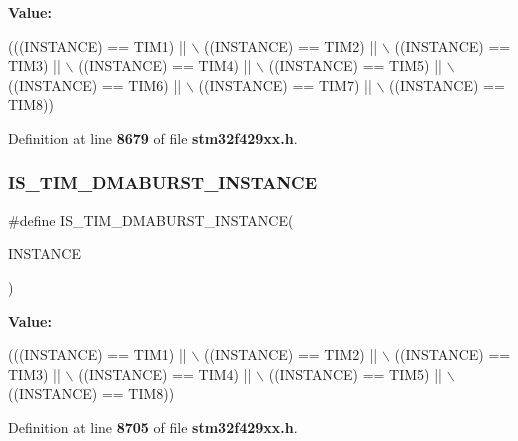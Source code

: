 {\bfseries Value\+:}
\begin{DoxyCode}
(((INSTANCE) == TIM1) || \(\backslash\)
                                       ((INSTANCE) == TIM2) || \(\backslash\)
                                       ((INSTANCE) == TIM3) || \(\backslash\)
                                       ((INSTANCE) == TIM4) || \(\backslash\)
                                       ((INSTANCE) == TIM5) || \(\backslash\)
                                       ((INSTANCE) == TIM6) || \(\backslash\)
                                       ((INSTANCE) == TIM7) || \(\backslash\)
                                       ((INSTANCE) == TIM8))
\end{DoxyCode}


Definition at line \textbf{ 8679} of file \textbf{ stm32f429xx.\+h}.

\mbox{\label{group__Exported__macros_ga1ed43d4e9823446a1b9d43afc452f42e}} 
\subsubsection{I\+S\+\_\+\+T\+I\+M\+\_\+\+D\+M\+A\+B\+U\+R\+S\+T\+\_\+\+I\+N\+S\+T\+A\+N\+CE}
{\footnotesize\ttfamily \#define I\+S\+\_\+\+T\+I\+M\+\_\+\+D\+M\+A\+B\+U\+R\+S\+T\+\_\+\+I\+N\+S\+T\+A\+N\+CE(\begin{DoxyParamCaption}\item[{}]{I\+N\+S\+T\+A\+N\+CE }\end{DoxyParamCaption})}

{\bfseries Value\+:}
\begin{DoxyCode}
(((INSTANCE) == TIM1) || \(\backslash\)
                                             ((INSTANCE) == TIM2) || \(\backslash\)
                                             ((INSTANCE) == TIM3) || \(\backslash\)
                                             ((INSTANCE) == TIM4) || \(\backslash\)
                                             ((INSTANCE) == TIM5) || \(\backslash\)
                                             ((INSTANCE) == TIM8))
\end{DoxyCode}


Definition at line \textbf{ 8705} of file \textbf{ stm32f429xx.\+h}.

